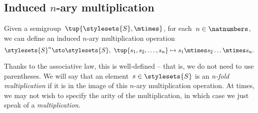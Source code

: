 \subsection{Induced $n$-ary multiplication}
Given a semigroup~$\tup{\stylesets{S}, \mtimes}$, for each~$n \in \natnumbers$, we can define an induced $n$-ary multiplication operation
\begin{equation*}
    \stylesets{S}^n \sto \stylesets{S}, \ \tup{s_1, s_2, \dots, s_n} \mapsto s_1 \mtimes s_2 \dots \mtimes s_n.
\end{equation*}


Thanks to the associative law, this is well-defined -- that is, we do not need to use parentheses.
We will say that an element~$s \in \stylesets{S}$ is an \emph{n-fold multiplication} if it is in the image of this $n$-ary multiplication operation.
At times, we may not wish to specify the arity of the multiplication, in which case we just speak of a \emph{multiplication}.

\showslides{
    \begin{forslides}
        \begin{equation}
            \label{eq:sg-mora}
            \mora
        \end{equation}
        \begin{equation}
            \label{eq:sg-morb}
            \morb
        \end{equation}
        \begin{equation}
            \label{eq:sg-morab}
            \mora\then\morb
        \end{equation}
    \end{forslides}
}
